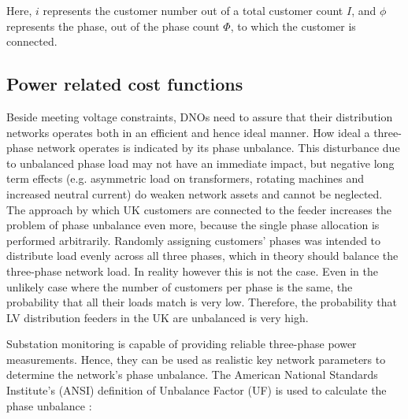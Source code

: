 

Here, $i$ represents the customer number out of a total customer count $I$, and $\phi$ represents the phase, out of the phase count $\Phi$, to which the customer is connected.

\subsection{Power related cost functions}
\label{ch1:subsec:powers-related-cost-functions}

Beside meeting voltage constraints, DNOs need to assure that their distribution networks operates both in an efficient and hence ideal manner.
How ideal a three-phase network operates is indicated by its phase unbalance.
This disturbance due to unbalanced phase load may not have an immediate impact, but negative long term effects (e.g. asymmetric load on transformers, rotating machines and increased neutral current) do weaken network assets and cannot be neglected.
The approach by which UK customers are connected to the feeder increases the problem of phase unbalance even more, because the single phase allocation is performed arbitrarily.
Randomly assigning customers' phases was intended to distribute load evenly across all three phases, which in theory should balance the three-phase network load.
In reality however this is not the case.
Even in the unlikely case where the number of customers per phase is the same, the probability that all their loads match is very low.
Therefore, the probability that LV distribution feeders in the UK are unbalanced is very high.


Substation monitoring is capable of providing reliable three-phase power measurements.
Hence, they can be used as realistic key network parameters to determine the network's phase unbalance.
The American National Standards Institute's (ANSI) definition of Unbalance Factor (UF) is used to calculate the phase unbalance \cite{ANSI-MB-1-2011}:

